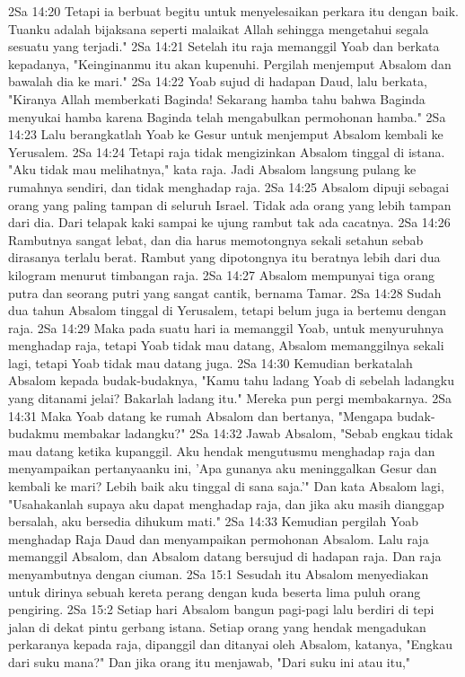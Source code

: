 2Sa 14:20  Tetapi ia berbuat begitu untuk menyelesaikan perkara itu dengan baik. Tuanku adalah bijaksana seperti malaikat Allah sehingga mengetahui segala sesuatu yang terjadi."
2Sa 14:21  Setelah itu raja memanggil Yoab dan berkata kepadanya, "Keinginanmu itu akan kupenuhi. Pergilah menjemput Absalom dan bawalah dia ke mari."
2Sa 14:22  Yoab sujud di hadapan Daud, lalu berkata, "Kiranya Allah memberkati Baginda! Sekarang hamba tahu bahwa Baginda menyukai hamba karena Baginda telah mengabulkan permohonan hamba."
2Sa 14:23  Lalu berangkatlah Yoab ke Gesur untuk menjemput Absalom kembali ke Yerusalem.
2Sa 14:24  Tetapi raja tidak mengizinkan Absalom tinggal di istana. "Aku tidak mau melihatnya," kata raja. Jadi Absalom langsung pulang ke rumahnya sendiri, dan tidak menghadap raja.
2Sa 14:25  Absalom dipuji sebagai orang yang paling tampan di seluruh Israel. Tidak ada orang yang lebih tampan dari dia. Dari telapak kaki sampai ke ujung rambut tak ada cacatnya.
2Sa 14:26  Rambutnya sangat lebat, dan dia harus memotongnya sekali setahun sebab dirasanya terlalu berat. Rambut yang dipotongnya itu beratnya lebih dari dua kilogram menurut timbangan raja.
2Sa 14:27  Absalom mempunyai tiga orang putra dan seorang putri yang sangat cantik, bernama Tamar.
2Sa 14:28  Sudah dua tahun Absalom tinggal di Yerusalem, tetapi belum juga ia bertemu dengan raja.
2Sa 14:29  Maka pada suatu hari ia memanggil Yoab, untuk menyuruhnya menghadap raja, tetapi Yoab tidak mau datang, Absalom memanggilnya sekali lagi, tetapi Yoab tidak mau datang juga.
2Sa 14:30  Kemudian berkatalah Absalom kepada budak-budaknya, "Kamu tahu ladang Yoab di sebelah ladangku yang ditanami jelai? Bakarlah ladang itu." Mereka pun pergi membakarnya.
2Sa 14:31  Maka Yoab datang ke rumah Absalom dan bertanya, "Mengapa budak-budakmu membakar ladangku?"
2Sa 14:32  Jawab Absalom, "Sebab engkau tidak mau datang ketika kupanggil. Aku hendak mengutusmu menghadap raja dan menyampaikan pertanyaanku ini, 'Apa gunanya aku meninggalkan Gesur dan kembali ke mari? Lebih baik aku tinggal di sana saja.'" Dan kata Absalom lagi, "Usahakanlah supaya aku dapat menghadap raja, dan jika aku masih dianggap bersalah, aku bersedia dihukum mati."
2Sa 14:33  Kemudian pergilah Yoab menghadap Raja Daud dan menyampaikan permohonan Absalom. Lalu raja memanggil Absalom, dan Absalom datang bersujud di hadapan raja. Dan raja menyambutnya dengan ciuman.
2Sa 15:1  Sesudah itu Absalom menyediakan untuk dirinya sebuah kereta perang dengan kuda beserta lima puluh orang pengiring.
2Sa 15:2  Setiap hari Absalom bangun pagi-pagi lalu berdiri di tepi jalan di dekat pintu gerbang istana. Setiap orang yang hendak mengadukan perkaranya kepada raja, dipanggil dan ditanyai oleh Absalom, katanya, "Engkau dari suku mana?" Dan jika orang itu menjawab, "Dari suku ini atau itu,"
